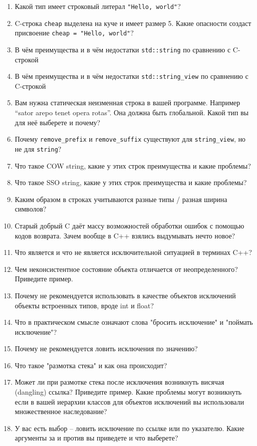 \documentclass[a4paper,12pt,oneside]{book}
\begin{document}
\begin{enumerate}
%
%
\item Какой тип имеет строковый литерал \lstinline!"Hello, world"!?
\item C-строка \lstinline!cheap! выделена на куче и имеет размер 5. Какие опасности создаст присвоение \lstinline!cheap = "Hello, world"!?
\item В чём преимущества и в чём недостатки \lstinline!std::string! по сравнению с C-строкой
\item В чём преимущества и в чём недостатки \lstinline!std::string_view! по сравнению с C-строкой
\item Вам нужна статическая неизменная строка в вашей программе. Например ``sator arepo tenet opera rotas''. Она должна быть глобальной. Какой тип вы для неё выберете и почему?
\item Почему \lstinline!remove_prefix! и \lstinline!remove_suffix! существуют для \lstinline!string_view!, но не для \lstinline!string!?
\item Что такое COW string, какие у этих строк преимущества и какие проблемы?
\item Что такое SSO string, какие у этих строк преимущества и какие проблемы?
\item Каким образом в строках учитываются разные типы / разная ширина символов?
%
%
\item Старый добрый C даёт массу возможностей обработки ошибок с помощью кодов возврата. Зачем вообще в C++ взялись выдумывать нечто новое?
\item Что является и что не является исключительной ситуацией в терминах C++?
\item Чем неконсистентное состояние объекта отличается от неопределенного? Приведите пример.
\item Почему не рекомендуется использовать в качестве объектов исключений объекты встроенных типов, вроде int и float?
\item Что в практическом смысле означают слова "бросить исключение" и "поймать исключение"?
\item Почему не рекомендуется ловить исключения по значению?
\item Что такое "размотка стека" и как она происходит?
\item Может ли при размотке стека после исключения возникнуть висячая (dangling) ссылка? Приведите пример.
Какие проблемы могут возникнуть если в вашей иерархии классов для объектов исключений вы использовали множественное наследование?
\item У вас есть выбор -- ловить исключение по ссылке или по указателю. Какие аргументы за и против вы приведете и что выберете?

\end{enumerate}
\end{document}

